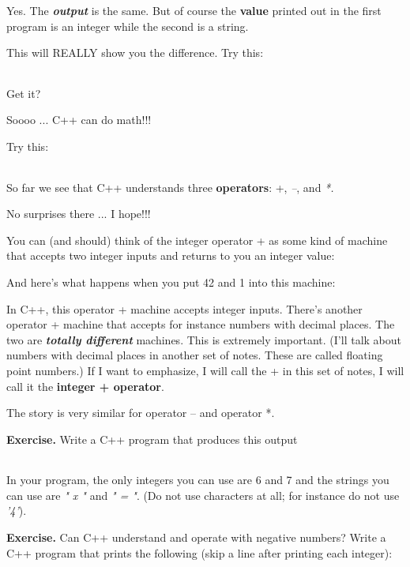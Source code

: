 \documentclass[
]{article}
\begin{document}
Yes. The \emph{\textbf{output}} is the same. But of course the
\textbf{value} printed out in the first program is an integer while the
second is a string.

This will REALLY show you the difference. Try this:

\begin{longtable}[]{@{}@{}}
\toprule
\endhead
\bottomrule
\end{longtable}

Get it?

Soooo ... C++ can do math!!!

Try this:

\begin{longtable}[]{@{}@{}}
\toprule
\endhead
\bottomrule
\end{longtable}

So far we see that C++ understands three \textbf{operators}: +,
\emph{--}, and \emph{*.}

No surprises there ... I hope!!!

You can (and should) think of the integer operator + as some kind of
machine that accepts two integer inputs and returns to you an integer
value:

And here's what happens when you put 42 and 1 into this machine:

In C++, this operator + machine accepts integer inputs. There's another
operator + machine that accepts for instance numbers with decimal
places. The two are \emph{\textbf{totally different}} machines. This is
extremely important. (I'll talk about numbers with decimal places in
another set of notes. These are called floating point numbers.) If I
want to emphasize, I will call the + in this set of notes, I will call
it the \textbf{integer + operator}.

The story is very similar for operator -- and operator *.

\textbf{Exercise.} Write a C++ program that produces this output

\begin{longtable}[]{@{}@{}}
\toprule
\endhead
\bottomrule
\end{longtable}

In your program, the only integers you can use are 6 and 7 and the
strings you can use are \emph{" x "} and \emph{" = "}. (Do not use
characters at all; for instance do not use \emph{'4'}).

\textbf{Exercise.} Can C++ understand and operate with negative numbers?
Write a C++ program that prints the following (skip a line after
printing each integer):
\end{document}
